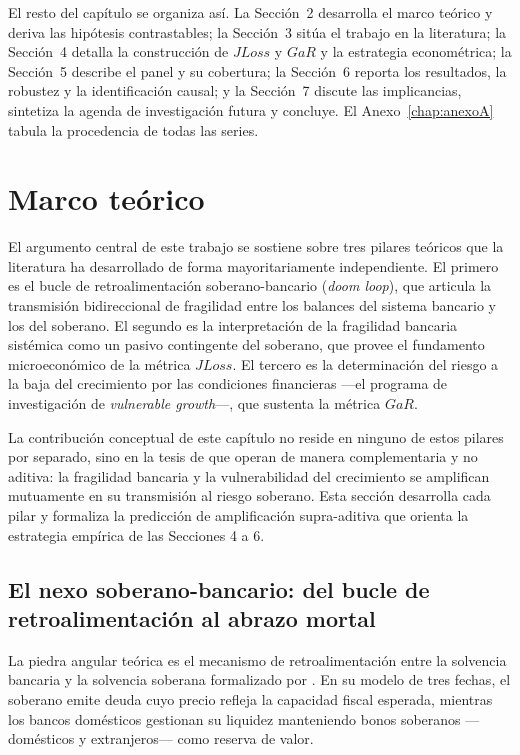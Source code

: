 El resto del capítulo se organiza así. La Sección~2 desarrolla el marco teórico y deriva las hipótesis contrastables; la Sección~3 sitúa el trabajo en la literatura; la Sección~4 detalla la construcción de $JLoss$ y $GaR$ y la estrategia econométrica; la Sección~5 describe el panel y su cobertura; la Sección~6 reporta los resultados, la robustez y la identificación causal; y la Sección~7 discute las implicancias, sintetiza la agenda de investigación futura y concluye. El Anexo~\ref{chap:anexoA} tabula la procedencia de todas las series.

\section{Marco teórico}

El argumento central de este trabajo se sostiene sobre tres pilares teóricos que la literatura ha desarrollado de forma mayoritariamente independiente. El primero es el bucle de retroalimentación soberano-bancario (\textit{doom loop}), que articula la transmisión bidireccional de fragilidad entre los balances del sistema bancario y los del soberano. El segundo es la interpretación de la fragilidad bancaria sistémica como un pasivo contingente del soberano, que provee el fundamento microeconómico de la métrica $JLoss$. El tercero es la determinación del riesgo a la baja del crecimiento por las condiciones financieras —el programa de investigación de \textit{vulnerable growth}—, que sustenta la métrica $GaR$.

La contribución conceptual de este capítulo no reside en ninguno de estos pilares por separado, sino en la tesis de que operan de manera complementaria y no aditiva: la fragilidad bancaria y la vulnerabilidad del crecimiento se amplifican mutuamente en su transmisión al riesgo soberano. Esta sección desarrolla cada pilar y formaliza la predicción de amplificación supra-aditiva que orienta la estrategia empírica de las Secciones 4 a 6.

\subsection{El nexo soberano-bancario: del bucle de retroalimentación al abrazo mortal}

La piedra angular teórica es el mecanismo de retroalimentación entre la solvencia bancaria y la solvencia soberana formalizado por \citet{FarhiTirole2018b}. En su modelo de tres fechas, el soberano emite deuda cuyo precio refleja la capacidad fiscal esperada, mientras los bancos domésticos gestionan su liquidez manteniendo bonos soberanos —domésticos y extranjeros— como reserva de valor.

